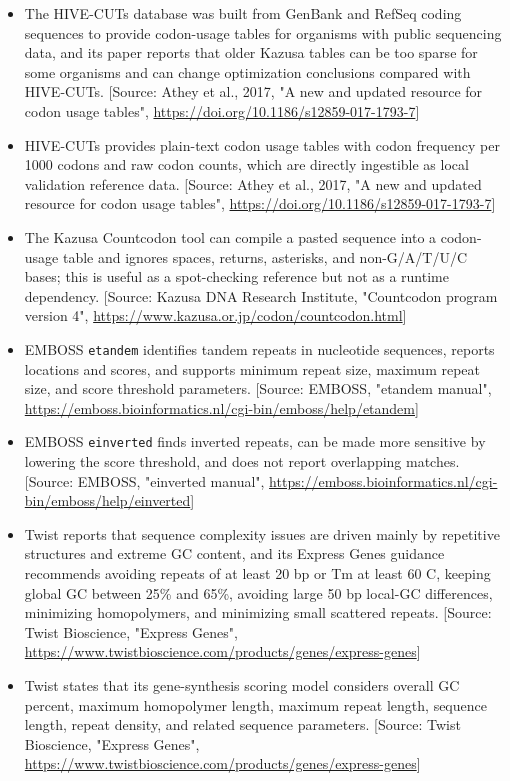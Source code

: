 \documentclass[11pt]{report}
\begin{document}
\begin{itemize}
\item The HIVE-CUTs database was built from GenBank and RefSeq coding sequences to provide codon-usage tables for organisms with public sequencing data, and its paper reports that older Kazusa tables can be too sparse for some organisms and can change optimization conclusions compared with HIVE-CUTs. [Source: Athey et al., 2017, "A new and updated resource for codon usage tables", \url{https://doi.org/10.1186/s12859-017-1793-7}]
\item HIVE-CUTs provides plain-text codon usage tables with codon frequency per 1000 codons and raw codon counts, which are directly ingestible as local validation reference data. [Source: Athey et al., 2017, "A new and updated resource for codon usage tables", \url{https://doi.org/10.1186/s12859-017-1793-7}]
\item The Kazusa Countcodon tool can compile a pasted sequence into a codon-usage table and ignores spaces, returns, asterisks, and non-G/A/T/U/C bases; this is useful as a spot-checking reference but not as a runtime dependency. [Source: Kazusa DNA Research Institute, "Countcodon program version 4", \url{https://www.kazusa.or.jp/codon/countcodon.html}]
\item EMBOSS \texttt{etandem} identifies tandem repeats in nucleotide sequences, reports locations and scores, and supports minimum repeat size, maximum repeat size, and score threshold parameters. [Source: EMBOSS, "etandem manual", \url{https://emboss.bioinformatics.nl/cgi-bin/emboss/help/etandem}]
\item EMBOSS \texttt{einverted} finds inverted repeats, can be made more sensitive by lowering the score threshold, and does not report overlapping matches. [Source: EMBOSS, "einverted manual", \url{https://emboss.bioinformatics.nl/cgi-bin/emboss/help/einverted}]
\item Twist reports that sequence complexity issues are driven mainly by repetitive structures and extreme GC content, and its Express Genes guidance recommends avoiding repeats of at least 20 bp or Tm at least 60 C, keeping global GC between 25\% and 65\%, avoiding large 50 bp local-GC differences, minimizing homopolymers, and minimizing small scattered repeats. [Source: Twist Bioscience, "Express Genes", \url{https://www.twistbioscience.com/products/genes/express-genes}]
\item Twist states that its gene-synthesis scoring model considers overall GC percent, maximum homopolymer length, maximum repeat length, sequence length, repeat density, and related sequence parameters. [Source: Twist Bioscience, "Express Genes", \url{https://www.twistbioscience.com/products/genes/express-genes}]

\end{itemize}
\end{document}
